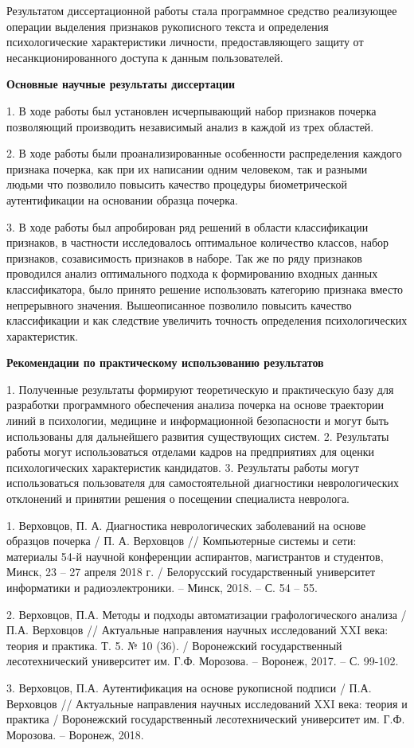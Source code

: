 Результатом диссертационной работы стала программное средство реализующее операции выделения признаков рукописного текста и определения психологические характеристики личности, предоставляющего защиту от несанкционированного доступа к данным пользователей.


\textbf{Основные научные результаты диссертации}

1. В ходе работы был установлен исчерпывающий набор признаков почерка позволяющий производить независимый анализ в каждой из трех областей.

2. В ходе работы были проанализированные особенности распределения каждого признака почерка, как при их написании одним человеком, так и разными людьми что позволило повысить качество процедуры биометрической аутентификации на основании образца почерка.

3. В ходе работы был апробирован ряд решений в области классификации признаков, в частности исследовалось оптимальное количество классов, набор признаков, созависимость признаков в наборе. Так же по ряду признаков проводился анализ оптимального подхода к формированию входных данных классификатора, было принято решение использовать категорию признака вместо непрерывного значения. Вышеописанное позволило повысить качество классификации и как следствие увеличить точность определения психологических характеристик.

\bigskip
\textbf{Рекомендации по практическому использованию результатов}
\bigskip

1.	Полученные результаты формируют теоретическую и практическую базу для разработки программного обеспечения анализа почерка на основе траектории линий в психологии, медицине и информационной безопасности и могут быть использованы для дальнейшего развития существующих систем.
2.	Результаты работы могут использоваться отделами кадров на предприятиях для оценки психологических характеристик кандидатов.
3.	Результаты работы могут использоваться пользователя для самостоятельной диагностики неврологических отклонений и принятии решения о посещении специалиста невролога.


1. Верховцов, П. А. Диагностика неврологических заболеваний на основе образцов почерка / П. А. Верховцов // Компьютерные системы и сети: материалы 54-й научной конференции аспирантов, магистрантов и студентов, Минск, 23 – 27 апреля 2018 г. / Белорусский государственный университет информатики и радиоэлектроники. – Минск, 2018. – С. 54 – 55.

2. Верховцов, П.А. Методы и подходы автоматизации графологического анализа / П.А. Верховцов // Актуальные направления научных исследований XXI века: теория и практика. Т. 5. № 10 (36). / Воронежский государственный лесотехнический университет им. Г.Ф. Морозова. – Воронеж, 2017. – С. 99-102.

3. Верховцов, П.А. Аутентификация на основе рукописной подписи / П.А. Верховцов // Актуальные направления научных исследований XXI века: теория и практика / Воронежский государственный лесотехнический университет им. Г.Ф. Морозова. – Воронеж, 2018.

\clearpage